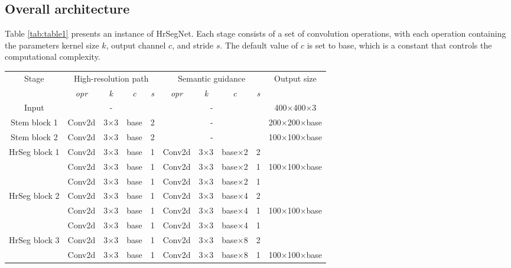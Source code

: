 \documentclass[preprint,12pt,authoryear]{elsarticle}
\begin{document}
\subsection{Overall architecture}
\label{subsec:Overallarchitecture}

Table \ref{tab:table1} presents an instance of HrSegNet. Each stage consists of a set of convolution operations, with each operation containing the parameters kernel size $k$, output channel $c$, and stride $s$. The default value of $c$ is set to base, which is a constant that controls the computational complexity.
\begin{center}
\begin{table}[t]
    \centering
    \begin{tabular}{ c|c c c c|c c c c|c } %
\toprule
\multirow{2}{*}{Stage}& \multicolumn{4}{c|}{High-resolution path} & \multicolumn{4}{c}{Semantic guidance }& Output size\\ 
\cline{2-10}
 & \textit{opr} & \textit{k} & \textit{c} & \textit{s} & \textit{opr} & \textit{k} & \textit{c} & \textit{s}  & \\ 
 \hline    
 Input & \multicolumn{4}{c|}{-} & \multicolumn{4}{c|}{-} & 400×400×3\\
 \hline
 Stem block 1 & Conv2d & 3×3 & base & 2 &  \multicolumn{4}{c|}{-} & 200×200×base\\
 \hline
 Stem block 2 & Conv2d & 3×3 & base & 2 &  \multicolumn{4}{c|}{-} & 100×100×base\\
 \hline
 \multirow{3}{*}{HrSeg block 1}  & Conv2d & 3×3 & base & 1 &  Conv2d & 3×3 & base×2 & 2 & \\

& Conv2d & 3×3 & base & 1 &  Conv2d & 3×3 & base×2 & 1 & 100×100×base\\

& Conv2d & 3×3 & base & 1 &  Conv2d & 3×3 & base×2 & 1 & \\
\hline
 \multirow{3}{*}{HrSeg block 2}  & Conv2d & 3×3 & base & 1 &  Conv2d & 3×3 & base×4 & 2 & \\

& Conv2d & 3×3 & base & 1 &  Conv2d & 3×3 & base×4 & 1 & 100×100×base\\

& Conv2d & 3×3 & base & 1 &  Conv2d & 3×3 & base×4 & 1 & \\
\hline
 \multirow{3}{*}{HrSeg block 3}  & Conv2d & 3×3 & base & 1 &  Conv2d & 3×3 & base×8 & 2 & \\

& Conv2d & 3×3 & base & 1 &  Conv2d & 3×3 & base×8 & 1 & 100×100×base\\


\end{tabular}
\end{table}
\end{center}
\end{document}
